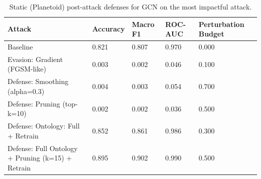 \begin{table}[t]
\centering
\small
\begin{tabular}{lllll}
\toprule
Attack & Accuracy & Macro F1 & ROC-AUC & Perturbation Budget \\
\midrule
Baseline & 0.821 & 0.807 & 0.970 & 0.000 \\
Evasion: Gradient (FGSM-like) & 0.003 & 0.002 & 0.046 & 0.100 \\
Defense: Smoothing (alpha=0.3) & 0.004 & 0.003 & 0.054 & 0.700 \\
Defense: Pruning (top-k=10) & 0.002 & 0.002 & 0.036 & 0.500 \\
Defense: Ontology: Full + Retrain & 0.852 & 0.861 & 0.986 & 0.300 \\
Defense: Full Ontology + Pruning (k=15) + Retrain & 0.895 & 0.902 & 0.990 & 0.500 \\
\bottomrule
\end{tabular}

\caption{Static (Planetoid) post-attack defenses for GCN on the most impactful attack.}
\label{tab:static_gcn_defenses}
\end{table}

